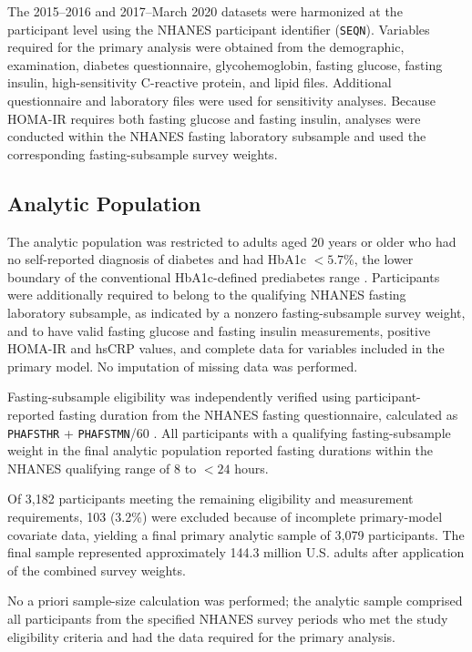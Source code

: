 \documentclass[11pt]{article}
\begin{document}
The 2015--2016 and 2017--March 2020 datasets were harmonized at the
participant level using the NHANES participant identifier (\texttt{SEQN}).
Variables required for the primary analysis were obtained from the
demographic, examination, diabetes questionnaire, glycohemoglobin,
fasting glucose, fasting insulin, high-sensitivity C-reactive protein,
and lipid files. Additional questionnaire and laboratory files were used for sensitivity analyses. 
Because HOMA-IR requires both fasting glucose and fasting insulin, analyses were conducted within the
NHANES fasting laboratory subsample and used the corresponding
fasting-subsample survey weights.

\subsection{Analytic Population}

The analytic population was restricted to adults aged 20 years or older
who had no self-reported diagnosis of diabetes and had HbA1c $<5.7\%$,
the lower boundary of the conventional HbA1c-defined prediabetes range
\citep{ADA2026Diagnosis}. Participants were additionally required to belong
to the qualifying NHANES fasting laboratory subsample, as indicated by a
nonzero fasting-subsample survey weight, and to have valid fasting glucose
and fasting insulin measurements, positive HOMA-IR and hsCRP values, and
complete data for variables included in the primary model. No imputation
of missing data was performed.

Fasting-subsample eligibility was independently verified using
participant-reported fasting duration from the NHANES fasting questionnaire,
calculated as \texttt{PHAFSTHR} + \texttt{PHAFSTMN}/60
\citep{NHANESFastingQuestionnaire2015,NHANESFastingQuestionnaire2017_2020}. All participants with a
qualifying fasting-subsample weight in the final analytic population reported
fasting durations within the NHANES qualifying range of 8 to $<24$ hours.

Of 3,182 participants meeting the remaining eligibility and measurement
requirements, 103 (3.2\%) were excluded because of incomplete primary-model
covariate data, yielding a final primary analytic sample of 3,079 participants.
The final sample represented approximately 144.3 million U.S. adults after
application of the combined survey weights.

No a priori sample-size calculation was performed; the analytic sample
comprised all participants from the specified NHANES survey periods who met
the study eligibility criteria and had the data required for the primary
analysis.
\end{document}
